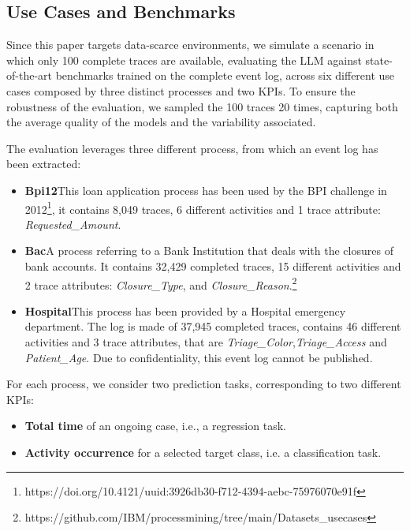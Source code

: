 \documentclass[manuscript,screen,review]{acmart}
\begin{document}
\subsection*{Use Cases and Benchmarks}\label{subsec:use_cases}

Since this paper targets data-scarce environments, we simulate a scenario in which only 100 complete traces are available, evaluating the LLM against state-of-the-art benchmarks trained on the complete event log, across six different use cases composed by three distinct processes and two KPIs. To ensure the robustness of the evaluation, we sampled the 100 traces 20 times, capturing both the average quality of the models and the variability associated.

The evaluation leverages three different process, from which an event log has been extracted:

\begin{itemize}

\item \textbf{Bpi12}\enspace This loan application process has been used by the BPI challenge in 2012\footnote{https://doi.org/10.4121/uuid:3926db30-f712-4394-aebc-75976070e91f}, it contains 8,049 traces, 6 different activities and 1 trace attribute: \textit{Requested\_Amount}.

\item \textbf{Bac}\enspace A process referring to a Bank Institution that deals with the closures of bank accounts. It contains 32,429 completed traces, 15 different activities and 2 trace attributes: \textit{Closure\_Type}, and \textit{Closure\_Reason}.\footnote{https://github.com/IBM/processmining/tree/main/Datasets\_usecases}

\item \textbf{Hospital}\enspace This process has been provided by a Hospital emergency department. The log is made of 37,945 completed traces, contains 46 different activities and 3 trace attributes, that are \textit{Triage\_Color},\textit{Triage\_Access} and \textit{Patient\_Age}. Due to confidentiality, this event log cannot be published.

\end{itemize}

For each process, we consider two prediction tasks, corresponding to two different KPIs:

\begin{itemize}

\item \textbf{Total time} of an ongoing case, i.e., a regression task.

\item \textbf{Activity occurrence} for a selected target class, i.e. a classification task. 

\end{itemize}
\end{document}
